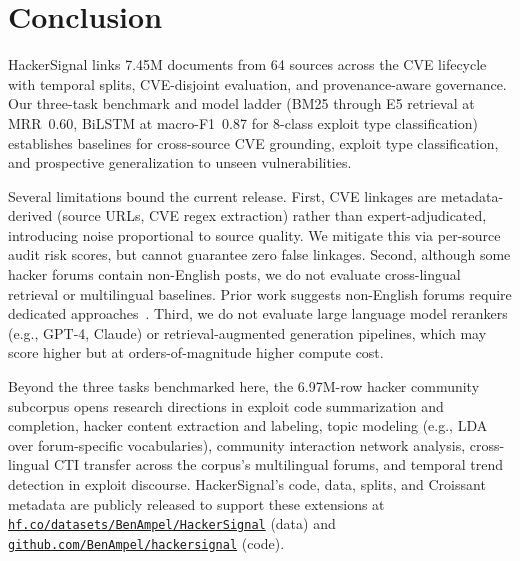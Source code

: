 \documentclass{article}
\begin{document}
\section{Conclusion}
\label{sec:discussion}

HackerSignal links 7.45M documents from 64 sources across the CVE lifecycle with temporal splits, CVE-disjoint evaluation, and provenance-aware governance. Our three-task benchmark and model ladder (BM25 through E5 retrieval at MRR~0.60, BiLSTM at macro-F1~0.87 for 8-class exploit type classification) establishes baselines for cross-source CVE grounding, exploit type classification, and prospective generalization to unseen vulnerabilities.

Several limitations bound the current release. First, CVE linkages are metadata-derived (source URLs, CVE regex extraction) rather than expert-adjudicated, introducing noise proportional to source quality. We mitigate this via per-source audit risk scores, but cannot guarantee zero false linkages. Second, although some hacker forums contain non-English posts, we do not evaluate cross-lingual retrieval or multilingual baselines. Prior work suggests non-English forums require dedicated approaches~\citep{ebrahimi2020crosslingual}. Third, we do not evaluate large language model rerankers (e.g., GPT-4, Claude) or retrieval-augmented generation pipelines, which may score higher but at orders-of-magnitude higher compute cost.

Beyond the three tasks benchmarked here, the 6.97M-row hacker community subcorpus opens research directions in exploit code summarization and completion, hacker content extraction and labeling, topic modeling (e.g., LDA over forum-specific vocabularies), community interaction network analysis, cross-lingual CTI transfer across the corpus's multilingual forums, and temporal trend detection in exploit discourse. HackerSignal's code, data, splits, and Croissant metadata are publicly released to support these extensions at \href{https://huggingface.co/datasets/BenAmpel/HackerSignal}{\texttt{hf.co/datasets/BenAmpel/HackerSignal}} (data) and \href{https://github.com/BenAmpel/hackersignal}{\texttt{github.com/BenAmpel/hackersignal}} (code).
\end{document}
